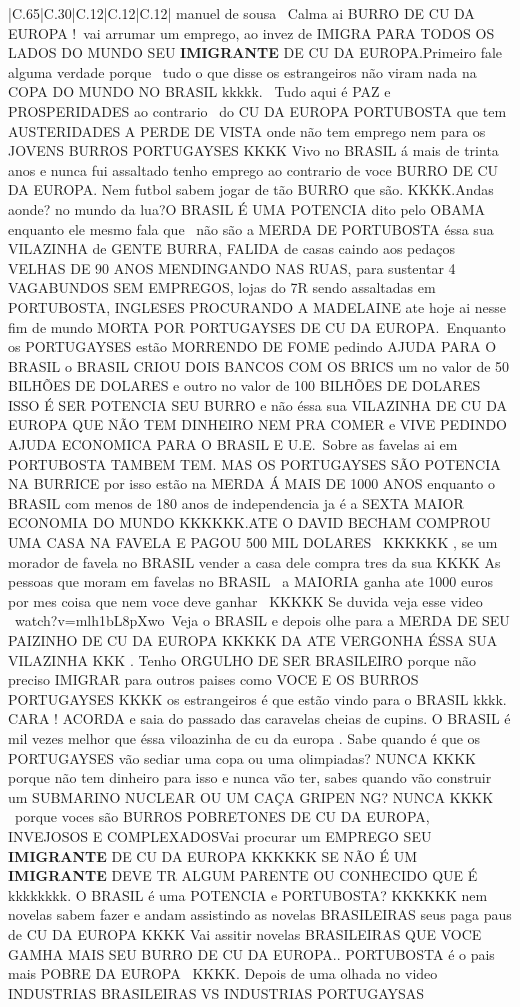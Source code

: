 \documentclass[11pt]{article}
\newlength\mylength
\begin{document}
\begin{center}
\begin{longtable}{|C{.65\mylength}|C{.30\mylength}|C{.12\mylength}|C{.12\mylength}|C{.12\mylength}|}
  \small \@luis manuel de sousa  Calma ai BURRO DE CU DA EUROPA ! vai arrumar um emprego, ao invez de IMIGRA PARA TODOS OS LADOS DO MUNDO SEU \textbf{IMIGRANTE} DE CU DA EUROPA.Primeiro fale alguma verdade porque  tudo o que disse os estrangeiros não viram nada na COPA DO MUNDO NO BRASIL kkkkk.  Tudo aqui é PAZ e PROSPERIDADES ao contrario  do CU DA EUROPA PORTUBOSTA que tem AUSTERIDADES A PERDE DE VISTA onde não tem emprego nem para os JOVENS BURROS PORTUGAYSES KKKK Vivo no BRASIL á mais de trinta anos e nunca fui assaltado tenho emprego ao contrario de voce BURRO DE CU DA EUROPA. Nem futbol sabem jogar de tão BURRO que são. KKKK.Andas aonde? no mundo da lua?O BRASIL É UMA POTENCIA dito pelo OBAMA enquanto ele mesmo fala que  não são a MERDA DE PORTUBOSTA éssa sua VILAZINHA de GENTE BURRA, FALIDA de casas caindo aos pedaços VELHAS DE 90 ANOS MENDINGANDO NAS RUAS, para sustentar 4 VAGABUNDOS SEM EMPREGOS, lojas do 7R sendo assaltadas em PORTUBOSTA, INGLESES PROCURANDO A MADELAINE ate hoje ai nesse fim de mundo MORTA POR PORTUGAYSES DE CU DA EUROPA. Enquanto os PORTUGAYSES estão MORRENDO DE FOME pedindo AJUDA PARA O BRASIL o BRASIL CRIOU DOIS BANCOS COM OS BRICS um no valor de 50 BILHÕES DE DOLARES e outro no valor de 100 BILHÕES DE DOLARES ISSO É SER POTENCIA SEU BURRO e não éssa sua VILAZINHA DE CU DA EUROPA QUE NÃO TEM DINHEIRO NEM PRA COMER e VIVE PEDINDO AJUDA ECONOMICA PARA O BRASIL E U.E. Sobre as favelas ai em PORTUBOSTA TAMBEM TEM. MAS OS PORTUGAYSES SÃO POTENCIA NA BURRICE por isso estão na MERDA Á MAIS DE 1000 ANOS enquanto o BRASIL com menos de 180 anos de independencia ja é a SEXTA MAIOR ECONOMIA DO MUNDO KKKKKK.ATE O DAVID BECHAM COMPROU UMA CASA NA FAVELA E PAGOU 500 MIL DOLARES  KKKKKK , se um morador de favela no BRASIL vender a casa dele compra tres da sua KKKK As pessoas que moram em favelas no BRASIL  a MAIORIA ganha ate 1000 euros por mes coisa que nem voce deve ganhar  KKKKK Se duvida veja esse video  watch?v=mlh1bL8pXwo Veja o BRASIL e depois olhe para a MERDA DE SEU PAIZINHO DE CU DA EUROPA KKKKK DA ATE VERGONHA ÉSSA SUA VILAZINHA KKK . Tenho ORGULHO DE SER BRASILEIRO porque não preciso IMIGRAR para outros paises como VOCE E OS BURROS PORTUGAYSES KKKK os estrangeiros é que estão vindo para o BRASIL kkkk. CARA ! ACORDA e saia do passado das caravelas cheias de cupins. O BRASIL é mil vezes melhor que éssa viloazinha de cu da europa . Sabe quando é que os PORTUGAYSES vão sediar uma copa ou uma olimpiadas? NUNCA KKKK porque não tem dinheiro para isso e nunca vão ter, sabes quando vão construir um SUBMARINO NUCLEAR OU UM CAÇA GRIPEN NG? NUNCA KKKK  porque voces são BURROS POBRETONES DE CU DA EUROPA, INVEJOSOS E COMPLEXADOSVai procurar um EMPREGO SEU \textbf{IMIGRANTE} DE CU DA EUROPA KKKKKK SE NÃO É UM \textbf{IMIGRANTE} DEVE TR ALGUM PARENTE OU CONHECIDO QUE É kkkkkkkk. O BRASIL é uma POTENCIA e PORTUBOSTA? KKKKKK nem novelas sabem fazer e andam assistindo as novelas BRASILEIRAS seus paga paus de CU DA EUROPA KKKK Vai assitir novelas BRASILEIRAS QUE VOCE GAMHA MAIS SEU BURRO DE CU DA EUROPA.. PORTUBOSTA é o pais mais POBRE DA EUROPA  KKKK. Depois de uma olhada no video INDUSTRIAS BRASILEIRAS VS INDUSTRIAS PORTUGAYSAS 
\end{longtable}
\end{center}
\end{document}
